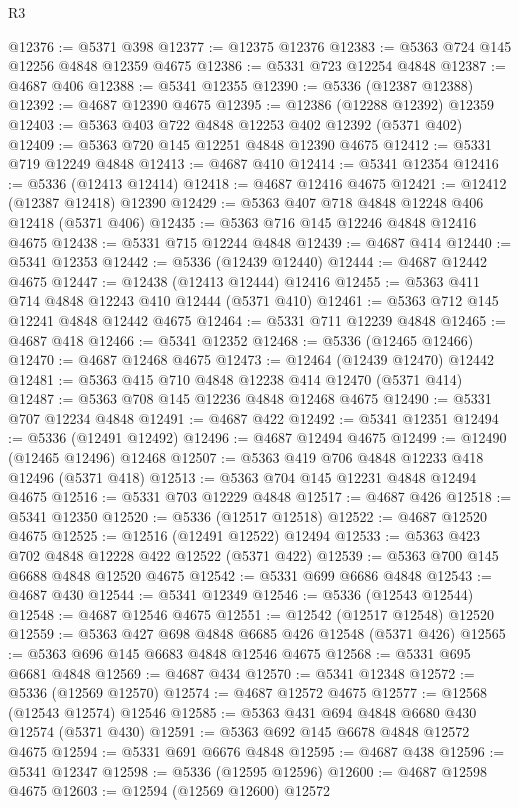 \begin{lexlean}{R3}
\begin{coremodule}
@12376 := @5371 @398
@12377 := @12375 @12376
@12383 := @5363 @724 @145 @12256 @4848 @12359 @4675
@12386 := @5331 @723 @12254 @4848
@12387 := @4687 @406
@12388 := @5341 @12355
@12390 := @5336 (@12387 @12388)
@12392 := @4687 @12390 @4675
@12395 := @12386 (@12288 @12392) @12359
@12403 := @5363 @403 @722 @4848 @12253 @402 @12392 (@5371 @402)
@12409 := @5363 @720 @145 @12251 @4848 @12390 @4675
@12412 := @5331 @719 @12249 @4848
@12413 := @4687 @410
@12414 := @5341 @12354
@12416 := @5336 (@12413 @12414)
@12418 := @4687 @12416 @4675
@12421 := @12412 (@12387 @12418) @12390
@12429 := @5363 @407 @718 @4848 @12248 @406 @12418 (@5371 @406)
@12435 := @5363 @716 @145 @12246 @4848 @12416 @4675
@12438 := @5331 @715 @12244 @4848
@12439 := @4687 @414
@12440 := @5341 @12353
@12442 := @5336 (@12439 @12440)
@12444 := @4687 @12442 @4675
@12447 := @12438 (@12413 @12444) @12416
@12455 := @5363 @411 @714 @4848 @12243 @410 @12444 (@5371 @410)
@12461 := @5363 @712 @145 @12241 @4848 @12442 @4675
@12464 := @5331 @711 @12239 @4848
@12465 := @4687 @418
@12466 := @5341 @12352
@12468 := @5336 (@12465 @12466)
@12470 := @4687 @12468 @4675
@12473 := @12464 (@12439 @12470) @12442
@12481 := @5363 @415 @710 @4848 @12238 @414 @12470 (@5371 @414)
@12487 := @5363 @708 @145 @12236 @4848 @12468 @4675
@12490 := @5331 @707 @12234 @4848
@12491 := @4687 @422
@12492 := @5341 @12351
@12494 := @5336 (@12491 @12492)
@12496 := @4687 @12494 @4675
@12499 := @12490 (@12465 @12496) @12468
@12507 := @5363 @419 @706 @4848 @12233 @418 @12496 (@5371 @418)
@12513 := @5363 @704 @145 @12231 @4848 @12494 @4675
@12516 := @5331 @703 @12229 @4848
@12517 := @4687 @426
@12518 := @5341 @12350
@12520 := @5336 (@12517 @12518)
@12522 := @4687 @12520 @4675
@12525 := @12516 (@12491 @12522) @12494
@12533 := @5363 @423 @702 @4848 @12228 @422 @12522 (@5371 @422)
@12539 := @5363 @700 @145 @6688 @4848 @12520 @4675
@12542 := @5331 @699 @6686 @4848
@12543 := @4687 @430
@12544 := @5341 @12349
@12546 := @5336 (@12543 @12544)
@12548 := @4687 @12546 @4675
@12551 := @12542 (@12517 @12548) @12520
@12559 := @5363 @427 @698 @4848 @6685 @426 @12548 (@5371 @426)
@12565 := @5363 @696 @145 @6683 @4848 @12546 @4675
@12568 := @5331 @695 @6681 @4848
@12569 := @4687 @434
@12570 := @5341 @12348
@12572 := @5336 (@12569 @12570)
@12574 := @4687 @12572 @4675
@12577 := @12568 (@12543 @12574) @12546
@12585 := @5363 @431 @694 @4848 @6680 @430 @12574 (@5371 @430)
@12591 := @5363 @692 @145 @6678 @4848 @12572 @4675
@12594 := @5331 @691 @6676 @4848
@12595 := @4687 @438
@12596 := @5341 @12347
@12598 := @5336 (@12595 @12596)
@12600 := @4687 @12598 @4675
@12603 := @12594 (@12569 @12600) @12572

\end{coremodule}
\end{lexlean}

